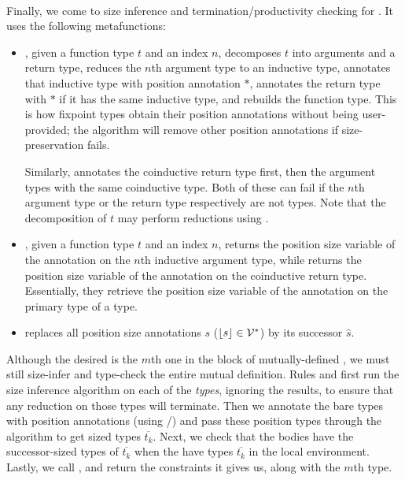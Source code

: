 \paragraph*{} Finally, we come to size inference and termination/productivity checking for \cofixpoints.
It uses the following metafunctions:
\begin{itemize}
  \item \setrecstars, given a function type $t$ and an index $n$, decomposes $t$ into arguments and a return type, reduces the $n$th argument type to an inductive type, annotates that inductive type with position annotation $*$, annotates the return type with $*$ if it has the same inductive type, and rebuilds the function type.
    This is how fixpoint types obtain their position annotations without being user-provided; the algorithm will remove other position annotations if size-preservation fails.
    
    Similarly, \setcorecstars annotates the coinductive return type first, then the argument types with the same coinductive type.
    Both of these can fail if the $n$th argument type or the return type respectively are not \coinductive types.
    Note that the decomposition of $t$ may perform reductions using \whnf.
  \item \getrecvar, given a function type $t$ and an index $n$, returns the position size variable of the annotation on the $n$th inductive argument type, while \getcorecvar returns the position size variable of the annotation on the coinductive return type.
    Essentially, they retrieve the position size variable of the annotation on the primary \corecursive type of a \cofixpoint type.
  \item \shift replaces all position size annotations $s$ (\ie $\lfloor s\rfloor \in \mathcal{V}^*$) by its successor $\hat{s}$.
\end{itemize}

Although the desired \cofixpoint is the $m$th one in the block of mutually-defined \cofixpoints, we must still size-infer and type-check the entire mutual definition.
Rules  and  first run the size inference algorithm on each of the \cofixpoint \emph{types}, ignoring the results, to ensure that any reduction on those types will terminate.
Then we annotate the bare types with position annotations (using \setrecstars/\setcorecstars) and pass these position types through the algorithm to get sized types $\overline{t_k}$.
Next, we check that the \cofixpoint bodies have the successor-sized types of $\overline{t_k}$ when the \cofixpoints have types $\overline{t_k}$ in the local environment.
Lastly, we call \RecCheckLoop, and return the constraints it gives us, along with the $m$th \cofixpoint type.

